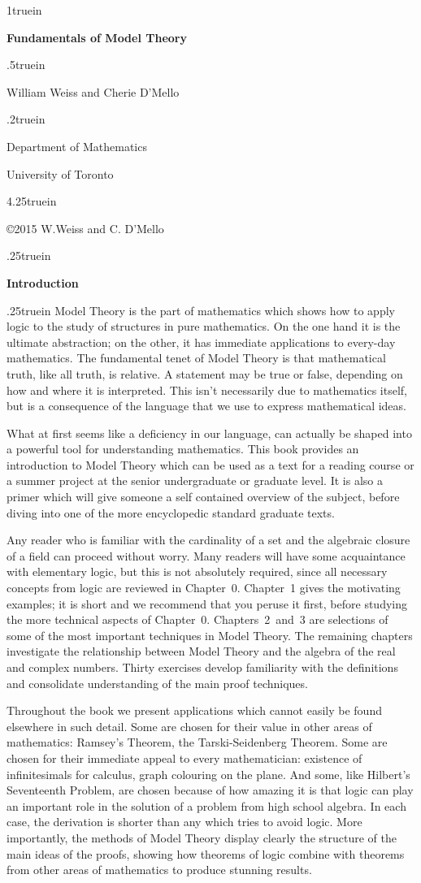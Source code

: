 \documentclass[titlepage, oneside]{amsbook}
\theoremstyle{plain}
\theoremstyle{definition}
\theoremstyle{remark}
\begin{document}
\thispagestyle{empty}
\vglue 1truein
\centerline{\bf \Huge  Fundamentals of Model Theory}
\vglue .5truein
\centerline{\LARGE William Weiss and Cherie D'Mello} 
\vglue .2truein
\centerline{Department of Mathematics}
\centerline{University of Toronto}
\vglue 4.25truein
\centerline{\footnotesize\copyright 2015 W.Weiss and C. D'Mello}
\vfill
\eject
\vglue .25truein
\thispagestyle{empty}
\newpage
\begin{center}
\bf Introduction
\end{center}
\vglue .25truein
\setcounter{page}{1}
Model Theory is the part of mathematics which shows how to apply logic
to the study of structures in pure mathematics.  On the one hand it is
the ultimate abstraction; on the other, it has immediate applications
to every-day mathematics.  The fundamental tenet of Model Theory is
that mathematical truth, like all truth, is relative.  A statement may
be true or false, depending on how and where it is interpreted.  This
isn't necessarily due to mathematics itself, but is a consequence of
the language that we use to express mathematical ideas.  

What at first seems like a deficiency in our language, can
actually be shaped into a powerful tool for understanding mathematics.
This book provides an introduction to Model Theory which can be used
as a text for a reading course or a summer project at the senior
undergraduate or graduate level.  It is also a primer which will give
someone a self contained overview of the subject, before diving into
one of the more encyclopedic standard graduate texts.  

Any reader who is familiar with the cardinality of a set and the
algebraic closure of a field can proceed without worry.  Many readers
will have some acquaintance with elementary logic, but this is not
absolutely required, since all necessary concepts from logic are
reviewed in Chapter~0.  Chapter~1 gives the  motivating
examples; it is short and we recommend that you peruse it first, before studying 
the more technical aspects of Chapter~0. Chapters~2~and~3 are
selections of some of the most
important techniques in Model Theory. The remaining chapters
investigate
the relationship between Model Theory and the algebra of the real and
complex numbers.  Thirty exercises develop familiarity with the
definitions and consolidate understanding of the main proof techniques. 


Throughout the book we present applications which cannot easily be
found elsewhere in such detail.  Some are chosen for their value in
other areas of mathematics:  Ramsey's Theorem, the Tarski-Seidenberg
Theorem.  Some are chosen for their immediate appeal to every
mathematician: existence of infinitesimals for calculus, graph
colouring on the plane.  And some, like Hilbert's Seventeenth Problem,
are chosen because of how amazing it is that logic can play an
important role in the solution of a problem from high school algebra. 
In each case, the derivation  is shorter than any 
which tries to avoid logic. More importantly, the methods of Model
Theory display clearly the structure of the main ideas of the proofs,
showing how theorems of logic combine with theorems from other areas of
mathematics to produce stunning results.
\end{document}
